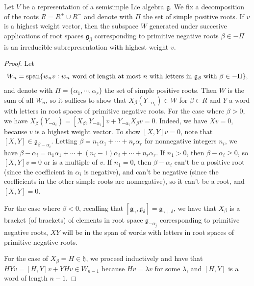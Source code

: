 \documentclass{report}
\begin{document}
\begin{exercise}[Exercise 14.14]\label{ex:irreducible_subrepresentation}
    Let $V$ be a representation of a semisimple Lie algebra $\mathfrak g$.
    We fix a decomposition of the roots $R = R^+ \cup R^-$ and denote with $\Pi$ the set of simple positive roots.
    If $v$ is a highest weight vector, then the subspace $W$ generated under succesive applications of root spaces $\mathfrak g_\beta$ corresponding to primitive negative roots $\beta \in -\Pi$ is an irreducible subrepresentation with highest weight $v$.
\end{exercise}
\begin{proof}
    Let
    \[
    W_n = \operatorname{span}\{ w_n v : w_n \text{ word of length at most } n \text{ with letters in } \mathfrak g_\beta \text{ with } \beta \in -\Pi \},
    \]
    and denote with $\Pi = \{\alpha_1, \cdots, \alpha_r\}$ the set of simple positive roots.
    Then $W$ is the sum of all $W_n$, so it suffices to show that $X_\beta (Y_{-\alpha_i}) \in W$ for $\beta \in R$ and $Y$ a word with letters in root spaces of primitive negative roots.
    For the case where $\beta > 0$, we have $X_\beta (Y_{-\alpha_i}) = [X_\beta, Y_{-\alpha_i}]v + Y_{-\alpha_i} X_\beta v = 0$.
    Indeed, we have $X v = 0$, because $v$ is a highest weight vector.
    To show $[X,Y]v = 0$, note that  $[X, Y] \in \mathfrak g_{\beta - \alpha_i}$.
    Letting $\beta = n_1 \alpha_1 + \cdots + n_r \alpha_r$ for nonnegative integers $n_i$, we have $\beta - \alpha_i = n_1 \alpha_1 + \cdots + (n_i - 1) \alpha_i + \cdots + n_r \alpha_r$.
    If $n_1 > 0$, then $\beta - \alpha_i \geq 0$, so $[X,Y]v = 0$ or is a multiple of $v$.
    If $n_1 = 0$, then $\beta - \alpha_i$ can't be a positive root (since the coefficient in $\alpha_i$ is negative), and can't be negative (since the coefficients in the other simple roots are nonnegative), so it can't be a root, and $[X,Y] = 0$.

    For the case where $\beta < 0$, recalling that $[\mathfrak g_{\gamma}, \mathfrak g_{\delta} ] = \mathfrak g_{\gamma + \delta}$, we have that $X_\beta$ is a bracket (of brackets) of elements in root space $\mathfrak g_{-\alpha_j}$ corresponding to primitive negative roots, $X Y$ will be in the span of words with letters in root spaces of primitive negative roots.

    For the case of $X_\beta = H \in \mathfrak h$, we proceed inductively and have that $H Y v = [H,Y]v + YHv \in W_{n-1}$ because $H v = \lambda v$ for some $\lambda$, and $[H, Y] $ is a word of length $n-1$.
\end{proof}
\end{document}
